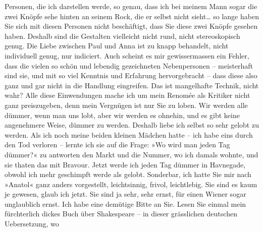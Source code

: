 \begin{ledgroupsized}[t]{13cm}
               Personen, die ich darstellen werde, so genau, dass
               ich bei meinem Mann sogar die zwei Knöpfe sehe hinten an seinem Rock, die er selbst
               nicht sieht{\dots} so lange haben Sie sich mit diesen Personen
               nicht beschäftigt, dass Sie diese zwei Knöpfe gesehen haben. Deshalb sind die
               Gestalten vielleicht nicht rund, nicht stereoskopisch genug. Die Liebe zwischen Paul
               und Anna ist zu knapp behandelt, nicht individuell genug, nur indiciert. Auch scheint
               es mir gewissermassen ein Fehler, dass die vielen so schön und lebendig gezeichneten
               Nebenpersonen – meisterhaft sind sie, und mit so viel Kenntnis und Erfahrung
               hervorgebracht – dass diese also ganz und gar nicht in die Handlung eingreifen. Das
               ist mangelhafte Technik, nicht wahr?\pend
           \pstart
           Alle diese Einwendungen mache ich um mein Renomée als Kritiker nicht ganz
               preiszugeben, denn mein Vergnügen ist nur Sie zu loben. Wir werden alle dümmer, wenn
               man uns lobt, aber wir werden es ohnehin, und es gibt keine angenehmere Weise, dümmer
               zu werden. Deshalb liebe ich selbst so sehr gelobt zu werden. Als ich noch meine
               beiden kleinen Mädchen
               hatte – {\pb}ich habe eins durch den Tod verloren –
               lernte ich sie auf die Frage: »Wo wird man jeden Tag dümmer?« zu antworten den Markt
               und die Nummer, wo ich damals wohnte, und sie thaten das mit Bravour. Jetzt werde ich
               jeden Tag dümmer in Havnegade, obwohl ich mehr
               geschimpft werde als gelobt. Sonderbar, ich hatte Sie mir nach »Anatol« ganz anders vorgestellt, leichtsinnig, frivol,
               leichtlebig. Sie sind es kaum je gewesen, glaub ich jetzt. Sie sind ja sehr, sehr
               ernst, für einen Wiener sogar unglaublich ernst.\pend
           \pstart
           Ich habe eine demütige Bitte an Sie. Lesen Sie einmal mein fürchterlich dickes Buch über Shakespeare – in dieser grässlichen deutschen Uebersetzung, wo

\end{ledgroupsized}
